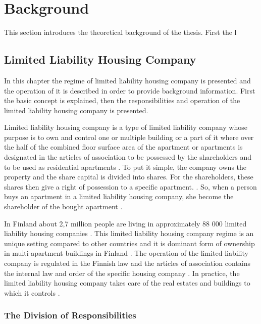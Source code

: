 \chapter{Background}
\label{chapter:background} 

This section introduces the theoretical background of the thesis. First the l

\section{Limited Liability Housing Company}

In this chapter the regime of limited liability housing company is presented and the operation of it is described in order to provide background information. First the basic concept is explained, then the responsibilities and operation of the limited liability housing company is presented.

Limited liability housing company is a type of limited liability company whose purpose is to own and control one or multiple building or a part of it where over the half of the combined floor surface area of the apartment or apartments is designated in the articles of association to be possessed by the shareholders and to be used as residential apartments \parencite{LLHA:2}. To put it simple, the company owns the property and the share capital is divided into shares. For the shareholders, these shares then give a right of possession to a specific apartment. \parencite{Lujanen:2017}. So, when a person buys an apartment in a limited liability housing company, she become the shareholder of the bought apartment \parencite{YIT}.

In Finland about 2,7 million people are living in approximately 88 000 limited liability housing companies \parencite{REMF, Stats}. This limited liability housing company regime is an unique setting compared to other countries and it is dominant form of ownership in multi-apartment buildings in Finland \parencite{Lujanen:2017}. The operation of the limited liability company is regulated in the Finnish law and the articles of association contains the internal law and order of the specific housing company \parencite{YIT}. In practice, the limited liability housing company takes care of the real estates and buildings to which it controls \parencite{LLHA:2}. 

\subsection{The Division of Responsibilities}

